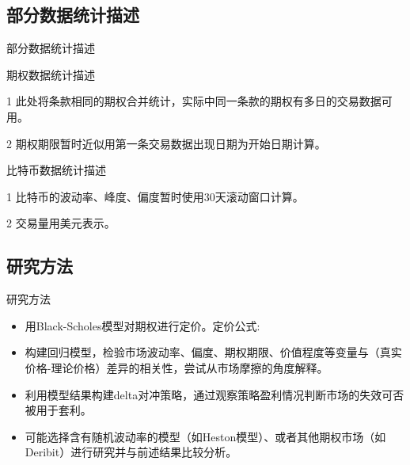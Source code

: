 \documentclass[11pt,dark]{mathbeamer}
\begin{document}
\subsection{部分数据统计描述}
\begin{frame}[allowframebreaks]{部分数据统计描述}

\begin{table}
  \tiny
  \caption{期权数据统计描述}
  \begin{threeparttable}
    
  \begin{tablenotes}
    \tiny
    \item[1] 此处将条款相同的期权合并统计，实际中同一条款的期权有多日的交易数据可用。
    \item[2] 期权期限暂时近似用第一条交易数据出现日期为开始日期计算。
  \end{tablenotes}
  \end{threeparttable}
  
\end{table}
\begin{table}
  \tiny
  \caption{比特币数据统计描述}
  \begin{threeparttable}
    
  \begin{tablenotes}
    \tiny
    \item[1] 比特币的波动率、峰度、偏度暂时使用30天滚动窗口计算。
    \item[2] 交易量用美元表示。
  \end{tablenotes}
  \end{threeparttable}
  
\end{table}
\end{frame}

\subsection{研究方法}
\begin{frame}{研究方法}
  \begin{itemize}
    \item 用Black-Scholes模型对期权进行定价。定价公式:
    \item 构建回归模型，检验市场波动率、偏度、期权期限、价值程度等变量与（真实价格-理论价格）差异的相关性，尝试从市场摩擦的角度解释。
    \item 利用模型结果构建delta对冲策略，通过观察策略盈利情况判断市场的失效可否被用于套利。
    \item 可能选择含有随机波动率的模型（如Heston模型）、或者其他期权市场（如Deribit）进行研究并与前述结果比较分析。
  \end{itemize}
\end{frame}
\end{document}
